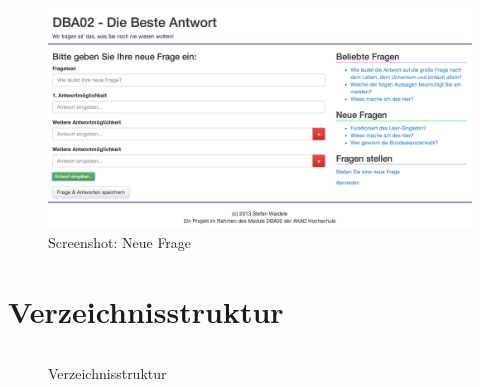 \begin{appendix}
\begin{figure}[h]
\includegraphics[width=\textwidth]{scr-neuefrage.jpg}
\caption{Screenshot: Neue Frage}
\label{scr:neuefrage}
\end{figure}

\section{Verzeichnisstruktur}

\begin{figure}[H]
\begin{spacing}{1.0}
\begin{verbatim}

\end{verbatim}
\caption{Verzeichnisstruktur}
\label{bash:struktur}
\end{spacing}
\end{figure}

\end{appendix}